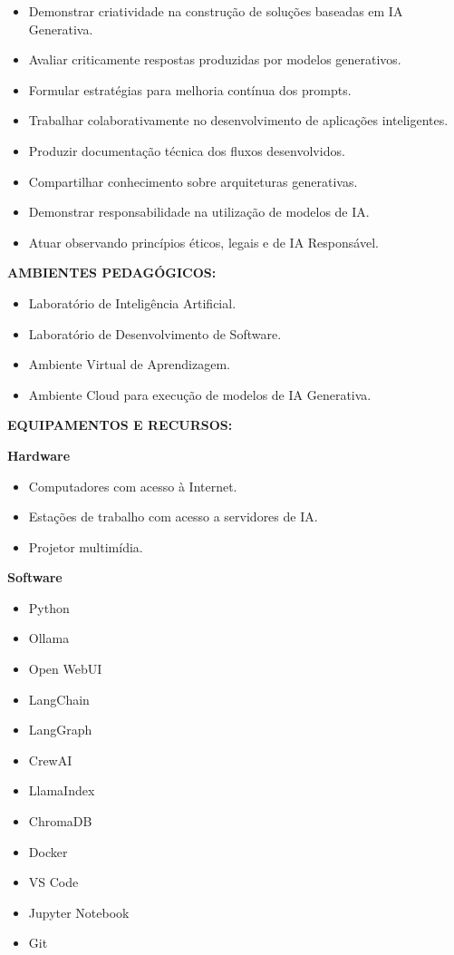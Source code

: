\begin{itemize}
\item Demonstrar criatividade na construção de soluções baseadas em IA Generativa.
\item Avaliar criticamente respostas produzidas por modelos generativos.
\item Formular estratégias para melhoria contínua dos prompts.
\item Trabalhar colaborativamente no desenvolvimento de aplicações inteligentes.
\item Produzir documentação técnica dos fluxos desenvolvidos.
\item Compartilhar conhecimento sobre arquiteturas generativas.
\item Demonstrar responsabilidade na utilização de modelos de IA.
\item Atuar observando princípios éticos, legais e de IA Responsável.
\end{itemize}

\textbf{AMBIENTES PEDAGÓGICOS:}

\begin{itemize}
\item Laboratório de Inteligência Artificial.
\item Laboratório de Desenvolvimento de Software.
\item Ambiente Virtual de Aprendizagem.
\item Ambiente Cloud para execução de modelos de IA Generativa.
\end{itemize}

\textbf{EQUIPAMENTOS E RECURSOS:}

\textbf{Hardware}

\begin{itemize}
\item Computadores com acesso à Internet.
\item Estações de trabalho com acesso a servidores de IA.
\item Projetor multimídia.
\end{itemize}

\textbf{Software}

\begin{itemize}
\item Python
\item Ollama
\item Open WebUI
\item LangChain
\item LangGraph
\item CrewAI
\item LlamaIndex
\item ChromaDB
\item Docker
\item VS Code
\item Jupyter Notebook
\item Git
\end{itemize}
